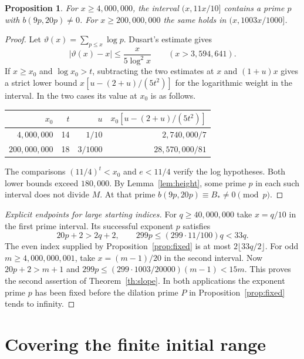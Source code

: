 \documentclass[11pt]{article}
\newtheorem{proposition}[theorem]{Proposition}
\numberwithin{equation}{section}
\begin{document}
\begin{proposition}\label{prop:bands}
For \(x\ge4{,}000{,}000\), the interval \((x,11x/10]\) contains a
prime \(p\) with \(b(9p,20p)\ne0\). For \(x\ge200{,}000{,}000\)
the same holds in \((x,1003x/1000]\).
\end{proposition}
\begin{proof}
Let \(\vartheta(x)=\sum_{p\le x}\log p\). Dusart's estimate
\cite[Theorem 5.2, table on p.~4]{dusart} gives
\[
       |\vartheta(x)-x|\le\frac{x}{5\log^2 x}
                  \qquad(x>3{,}594{,}641).
\]
If \(x\ge x_0\) and \(\log x_0>t\), subtracting the two estimates
at \(x\) and \((1+u)x\) gives a strict lower bound
\(x[u-(2+u)/(5t^2)]\) for the logarithmic weight in the interval.
In the two cases its value at \(x_0\) is as follows.
\begin{center}
\begin{tabular}{@{}rrrr@{}}\toprule
\(x_0\) & \(t\) & \(u\) & \(x_0[u-(2+u)/(5t^2)]\)\\\midrule
\(4{,}000{,}000\)&14&\(1/10\)&\(2{,}740{,}000/7\)\\
\(200{,}000{,}000\)&18&\(3/1000\)&\(28{,}570{,}000/81\)\\\bottomrule
\end{tabular}
\end{center}
The comparisons \((11/4)^t<x_0\) and \(e<11/4\) verify the log
hypotheses. Both lower bounds exceed \(180{,}000\). By
Lemma~\ref{lem:height}, some prime \(p\) in each such interval does
not divide \(M\). At that prime \(b(9p,20p)\equiv B_*\ne0\pmod p\).
\end{proof}

\begin{proof}[Explicit endpoints for large starting indices]
For \(q\ge40{,}000{,}000\) take \(x=q/10\) in the first prime interval.
Its successful exponent \(p\) satisfies
\[
       20p+2>2q+2,\qquad 299p\le(299\cdot11/100)q<33q .
\]
The even index supplied by Proposition~\ref{prop:fixed} is at most
\(2\lfloor33q/2\rfloor\). For odd \(m\ge4{,}000{,}000{,}001\), take
\(x=(m-1)/20\) in the second interval. Now \(20p+2>m+1\) and
\(299p\le(299\cdot1003/20000)(m-1)<15m\). This proves the second
assertion of Theorem~\ref{th:slope}. In both applications the exponent
prime \(p\) has been fixed before the dilation prime \(P\) in
Proposition~\ref{prop:fixed} tends to infinity.
\end{proof}

\section{Covering the finite initial range}\label{sec:finite}
\end{document}
